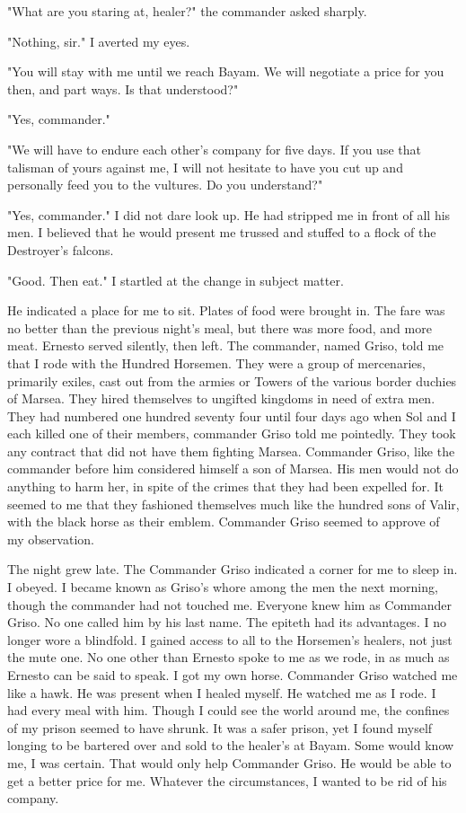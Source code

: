 \documentclass{article}
\begin{document}
"What are you staring at, healer?" the commander asked sharply.

"Nothing, sir." I averted my eyes.

"You will stay with me until we reach Bayam. We will negotiate a price for you then, and part ways. Is that understood?"

"Yes, commander."

"We will have to endure each other's company for five days. If you use that talisman of yours against me, I will not hesitate to have you cut up and personally feed you to the vultures. Do you understand?"

"Yes, commander." I did not dare look up. He had stripped me in front of all his men. I believed that he would present me trussed and stuffed to a flock of the Destroyer's falcons.

"Good. Then eat." I startled at the change in subject matter. 

He indicated a place for me to sit. Plates of food were brought in. The fare was no better than the previous night's meal, but there was more food, and more meat. Ernesto served silently, then left. The commander, named Griso, told me that I rode with the Hundred Horsemen. They were a group of mercenaries, primarily exiles, cast out from the armies or Towers of the various border duchies of Marsea. They hired themselves to ungifted kingdoms in need of extra men. They had numbered one hundred seventy four until four days ago when Sol and I each killed one of their members, commander Griso told me pointedly. They took any contract that did not have them fighting Marsea. Commander Griso, like the commander before him considered himself a son of Marsea. His men would not do anything to harm her, in spite of the crimes that they had been expelled for. It seemed to me that they fashioned themselves much like the hundred sons of Valir, with the black horse as their emblem. Commander Griso seemed to approve of my observation.

The night grew late. The Commander Griso indicated a corner for me to sleep in. I obeyed. I became known as Griso's whore among the men the next morning, though the commander had not touched me. Everyone knew him as Commander Griso. No one called him by his last name. The epiteth had its advantages. I no longer wore a blindfold. I gained access to all to the Horsemen's healers, not just the mute one. No one other than Ernesto spoke to me as we rode, in as much as Ernesto can be said to speak. I got my own horse. Commander Griso watched me like a hawk. He was present when I healed myself. He watched me as I rode. I had every meal with him. Though I could see the world around me, the confines of my prison seemed to have shrunk. It was a safer prison, yet I found myself longing to be bartered over and sold to the healer's at Bayam. Some would know me, I was certain. That would only help Commander Griso. He would be able to get a better price for me. Whatever the circumstances, I wanted to be rid of his company. 
\end{document}
